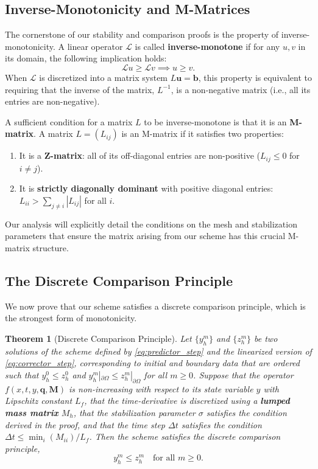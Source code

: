 \documentclass[pdflatex,sn-mathphys-num]{sn-jnl}%
\theoremstyle{thmstyleone}%
\newtheorem{thm}{Theorem}[section]
\numberwithin{equation}{section}
\begin{document}
\subsection{Inverse-Monotonicity and M-Matrices}

The cornerstone of our stability and comparison proofs is the property of inverse-monotonicity. A linear operator $\mathcal{L}$ is called \textbf{inverse-monotone} if for any $u,v$ in its domain, the following implication holds:
$$ \mathcal{L}u \ge \mathcal{L}v \implies u \ge v. $$
When $\mathcal{L}$ is discretized into a matrix system $L\bm{u}=\bm{b}$, this property is equivalent to requiring that the inverse of the matrix, $L^{-1}$, is a non-negative matrix (i.e., all its entries are non-negative).

A sufficient condition for a matrix $L$ to be inverse-monotone is that it is an \textbf{M-matrix}. A matrix $L=(L_{ij})$ is an M-matrix if it satisfies two properties:
\begin{enumerate}
    \item It is a \textbf{Z-matrix}: all of its off-diagonal entries are non-positive ($L_{ij} \le 0$ for $i \ne j$).
    \item It is \textbf{strictly diagonally dominant} with positive diagonal entries: $L_{ii} > \sum_{j \ne i} |L_{ij}|$ for all $i$.
\end{enumerate}
Our analysis will explicitly detail the conditions on the mesh and stabilization parameters that ensure the matrix arising from our scheme has this crucial M-matrix structure.

\subsection{The Discrete Comparison Principle}

We now prove that our scheme satisfies a discrete comparison principle, which is the strongest form of monotonicity.

\begin{thm}[Discrete Comparison Principle]
\label{thm:dcp_proved}
Let $\{y_h^m\}$ and $\{z_h^m\}$ be two solutions of the scheme defined by \eqref{eq:predictor_step} and the linearized version of \eqref{eq:corrector_step}, corresponding to initial and boundary data that are ordered such that $y_h^0 \le z_h^0$ and $y_h^m|_{\partial\Omega} \le z_h^m|_{\partial\Omega}$ for all $m \ge 0$. Suppose that the operator $f(x, t, y, \bm{q}, \bm{M})$ is non-increasing with respect to its state variable $y$ with Lipschitz constant $L_f$, that the time-derivative is discretized using a \textbf{lumped mass matrix} $M_h$, that the stabilization parameter $\sigma$ satisfies the condition derived in the proof, and that the time step $\Delta t$ satisfies the condition $\Delta t \le \min_i (M_{ii}) / L_f$. Then the scheme satisfies the discrete comparison principle,
$$y_h^m \le z_h^m \quad \text{for all } m \ge 0.$$
\end{thm}
\end{document}
